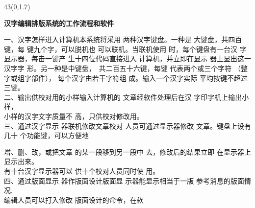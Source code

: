 \documentclass[linespread=1]{ctexart}
\begin{document}
\begin{textblock*}{43\ccwd}(0\ccwd,1.7\ccwd)
\hspace*{3\ccwd}\begin{minipage}{37\ccwd}\LARGE\textbf{汉字编辑排版系统的工作流程和软件}\linebreak\end{minipage}
\end{textblock*}
\vspace{4.39\ccwd}
\begin{minipage}[t]{10\ccwd}
\hspace{2\ccwd}%
{\heiti 一、汉字怎样进入计算机}\hspace{\ccwd}本系统将采用
两种汉字键盘。一种是
大键盘，共四百键，每\linebreak
键九个字，可以脱机也
可以联机。当联机使用
时，每个键盘有一台汉
字显示器，每击一键产
生十四位代码直接进入\linebreak
计算机，并立即在显示
器上显出这一汉字字
形。另一种是中键盘，\,
共二百五十六键，每键
代表两个或三个字符\linebreak
\hspace*{2pt}（整字或组字部件），\;
每个汉字由若干字符组
成。输入一个汉字实际
平均按键不超过三键。\\
\hspace*{2\ccwd}%
{\heiti 二、输出供校对用的小样}\hspace{\ccwd}输入计算机的
文章经软件处理后在汉
字印字机上输出小样，\\
小样的汉字文字质量不
高，只供校对修改用。\\
\hspace*{2\ccwd}%
{\heiti 三、通过汉字显示
器联机修改文章}\hspace{\ccwd}校对
人员可通过显示器修改
文章。键盘上设有几十
个功能键，可以方便地
\end{minipage}%
\hspace{\ccwd}%
\begin{minipage}[t]{10\ccwd}
增、删、改，或把文章
的某一段移到另一段中
去，修改后的结果立即
在显示器上显示出来。\\
有十台汉字显示器可以
供十个校对人员同时使
用。\\
\hspace*{2\ccwd}%
{\heiti 四、通过版面显示
器作版面设计}\hspace{\ccwd}版面显
示器能显示相当于一版
参考消息的版面情况,\\
编辑人员可以打入修改
版面设计的命令，在软
\end{minipage}%
\hspace{\ccwd}%
\end{document}
